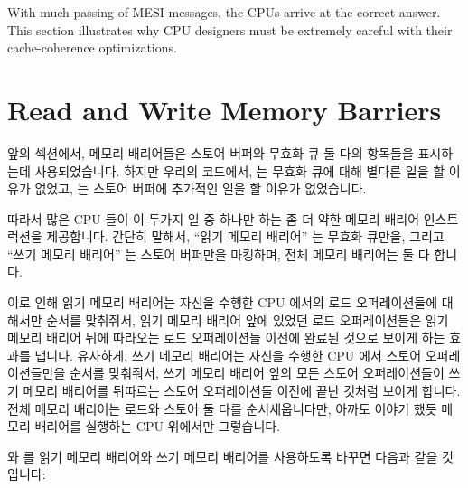 With much passing of MESI messages, the CPUs arrive at the correct answer.
This section illustrates why CPU designers must be extremely careful
with their cache-coherence optimizations.
\fi

\section{Read and Write Memory Barriers}
\label{sec:app:whymb:Read and Write Memory Barriers}

앞의 섹션에서, 메모리 배리어들은 스토어 버퍼와 무효화 큐 둘 다의 항목들을
표시하는데 사용되었습니다.
하지만 우리의 코드에서,  는 무효화 큐에 대해 별다른 일을 할 이유가
없었고,  는 스토어 버퍼에 추가적인 일을 할 이유가 없었습니다.

따라서 많은 CPU 들이 이 두가지 일 중 하나만 하는 좀 더 약한 메모리 배리어
인스트럭션을 제공합니다.
간단히 말해서, ``읽기 메모리 배리어'' 는 무효화 큐만을, 그리고 ``쓰기 메모리
배리어'' 는 스토어 버퍼만을 마킹하며, 전체 메모리 배리어는 둘 다 합니다.

이로 인해 읽기 메모리 배리어는 자신을 수행한 CPU 에서의 로드 오퍼레이션들에
대해서만 순서를 맞춰줘서, 읽기 메모리 배리어 앞에 있었던 로드 오퍼레이션들은
읽기 메모리 배리어 뒤에 따라오는 로드 오퍼레이션들 이전에 완료된 것으로 보이게
하는 효과를 냅니다.
유사하게, 쓰기 메모리 배리어는 자신을 수행한 CPU 에서 스토어 오퍼레이션들만을
순서를 맞춰줘서, 쓰기 메모리 배리어 앞의 모든 스토어 오퍼레이션들이 쓰기 메모리
배리어를 뒤따르는 스토어 오퍼레이션들 이전에 끝난 것처럼 보이게 합니다.
전체 메모리 배리어는 로드와 스토어 둘 다를 순서세웁니다만, 아까도 이야기 했듯
메모리 배리어를 실행하는 CPU 위에서만 그렇습니다.

 와  를 읽기 메모리 배리어와 쓰기 메모리 배리어를 사용하도록
바꾸면 다음과 같을 것입니다:
\iffalse

